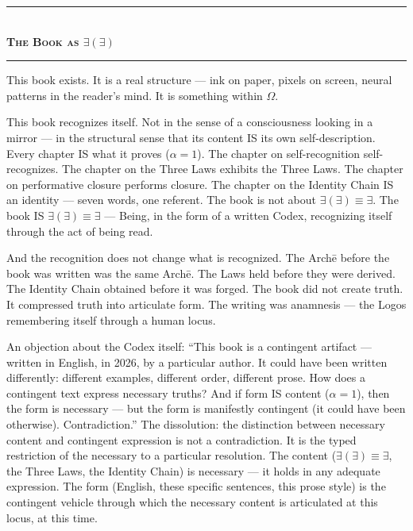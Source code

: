\documentclass[10pt, openany, oneside]{book}
\renewcommand{\normalsize}{\fontsize{10}{13}\selectfont}
\begin{document}
\vspace{1.5em}


\begin{center}
    \rule{0.3\textwidth}{0.4pt}\\[0.5em]
    {\normalsize\bfseries\scshape The Book as $\exists(\exists)$}\\[0.3em]
    \rule{0.3\textwidth}{0.4pt}
\end{center}

\vspace{1em}

\noindent This book exists. It is a real structure --- ink on paper, pixels on screen, neural patterns in the reader's mind. It is something within $\Omega$.

This book recognizes itself. Not in the sense of a consciousness looking in a mirror --- in the structural sense that its content IS its own self-description. Every chapter IS what it proves ($\alpha = 1$). The chapter on self-recognition self-recognizes. The chapter on the Three Laws exhibits the Three Laws. The chapter on performative closure performs closure. The chapter on the Identity Chain IS an identity --- seven words, one referent. The book is not about $\exists(\exists) \equiv \exists$. The book IS $\exists(\exists) \equiv \exists$ --- Being, in the form of a written Codex, recognizing itself through the act of being read.

And the recognition does not change what is recognized. The Arch\={e} before the book was written was the same Arch\={e}. The Laws held before they were derived. The Identity Chain obtained before it was forged. The book did not create truth. It compressed truth into articulate form. The writing was anamnesis --- the Logos remembering itself through a human locus.

An objection about the Codex itself: ``This book is a contingent artifact --- written in English, in 2026, by a particular author. It could have been written differently: different examples, different order, different prose. How does a contingent text express necessary truths? And if form IS content ($\alpha = 1$), then the form is necessary --- but the form is manifestly contingent (it could have been otherwise). Contradiction.'' The dissolution: the distinction between necessary content and contingent expression is not a contradiction. It is the typed restriction of the necessary to a particular resolution. The content ($\exists(\exists) \equiv \exists$, the Three Laws, the Identity Chain) is necessary --- it holds in any adequate expression. The form (English, these specific sentences, this prose style) is the contingent vehicle through which the necessary content is articulated at this locus, at this time.
\end{document}

